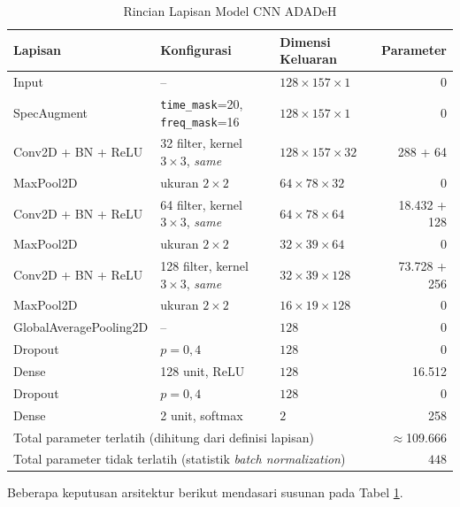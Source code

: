 \begin{table}[htbp]
  \centering
  \caption{Rincian Lapisan Model CNN ADADeH}
  \label{tab:lapisan-cnn}
  \begin{tabular}{@{}lllr@{}}
    \toprule
    \textbf{Lapisan} & \textbf{Konfigurasi} & \textbf{Dimensi Keluaran} & \textbf{Parameter} \\
    \midrule
    Input & -- & $128\times157\times1$ & 0 \\
    SpecAugment & \texttt{time\_mask}=20, \texttt{freq\_mask}=16 & $128\times157\times1$ & 0 \\
    Conv2D + BN + ReLU & 32 filter, kernel $3\times3$, \textit{same} & $128\times157\times32$ & 288 + 64 \\
    MaxPool2D & ukuran $2\times2$ & $64\times78\times32$ & 0 \\
    Conv2D + BN + ReLU & 64 filter, kernel $3\times3$, \textit{same} & $64\times78\times64$ & 18.432 + 128 \\
    MaxPool2D & ukuran $2\times2$ & $32\times39\times64$ & 0 \\
    Conv2D + BN + ReLU & 128 filter, kernel $3\times3$, \textit{same} & $32\times39\times128$ & 73.728 + 256 \\
    MaxPool2D & ukuran $2\times2$ & $16\times19\times128$ & 0 \\
    GlobalAveragePooling2D & -- & $128$ & 0 \\
    Dropout & $p{=}0{,}4$ & $128$ & 0 \\
    Dense & 128 unit, ReLU & $128$ & 16.512 \\
    Dropout & $p{=}0{,}4$ & $128$ & 0 \\
    Dense & 2 unit, softmax & $2$ & 258 \\
    \midrule
    \multicolumn{3}{l}{Total parameter terlatih (dihitung dari definisi lapisan)} & $\approx$109.666 \\
    \multicolumn{3}{l}{Total parameter tidak terlatih (statistik \textit{batch normalization})} & $448$ \\
    \bottomrule
  \end{tabular}
\end{table}

Beberapa keputusan arsitektur berikut mendasari susunan pada Tabel
\ref{tab:lapisan-cnn}.

